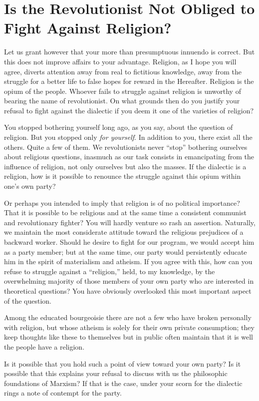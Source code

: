 \section*{Is the Revolutionist Not Obliged to Fight Against Religion?}

Let us grant however that your more than presumptuous innuendo is correct. But this does not improve affairs to your advantage. Religion, as I hope you will agree, diverts attention away from real to fictitious knowledge, away from the struggle for a better life to false hopes for reward in the Hereafter. Religion is the opium of the people. Whoever fails to struggle against religion is unworthy of bearing the name of revolutionist. On what grounds then do you justify your refusal to fight against the dialectic if you deem it one of the varieties of religion?

You stopped bothering yourself long ago, as you say, about the question of religion. But you stopped only \emph{for yourself}. In addition to you, there exist all the others. Quite a few of them. We revolutionists never “stop” bothering ourselves about religious questions, inasmuch as our task consists in emancipating from the influence of religion, not only ourselves but also the masses. If the dialectic is a religion, how is it possible to renounce the struggle against this opium within one’s own party?

Or perhaps you intended to imply that religion is of no political importance? That it is possible to be religious and at the same time a consistent communist and revolutionary fighter? You will hardly venture so rash an assertion. Naturally, we maintain the most considerate attitude toward the religious prejudices of a backward worker. Should he desire to fight for our program, we would accept him as a party member; but at the same time, our party would persistently educate him in the spirit of materialism and atheism. If you agree with this, how can you refuse to struggle against a “religion,” held, to my knowledge, by the overwhelming majority of those members of your own party who are interested in theoretical questions? You have obviously overlooked this most important aspect of the question.

Among the educated bourgeoisie there are not a few who have broken personally with religion, but whose atheism is solely for their own private consumption; they keep thoughts like these to themselves but in public often maintain that it is well the people have a religion.

Is it possible that you hold such a point of view toward your own party? Is it possible that this explains your refusal to discuss with us the philosophic foundations of Marxism? If that is the case, under your scorn for the dialectic rings a note of contempt for the party.

